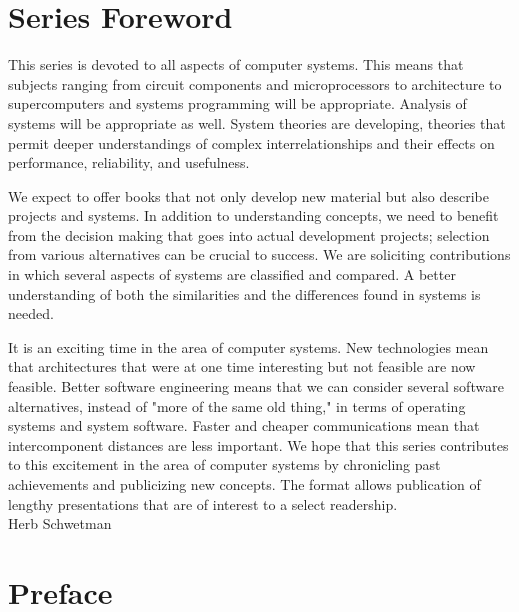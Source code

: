 \chapter*{Series Foreword}

\begingroup
\setlength{\parskip}{0pt}
\setlength{\parindent}{1.5em}

This series is devoted to all aspects of computer systems. This means that
subjects ranging from circuit components and microprocessors to architecture to
supercomputers and systems programming will be appropriate. Analysis of
systems will be appropriate as well. System theories are developing, theories
that permit deeper understandings of complex interrelationships and their
effects on performance, reliability, and usefulness.

We expect to offer books that not only develop new material but also describe
projects and systems. In addition to understanding concepts, we need to benefit
from the decision making that goes into actual development projects; selection
from various alternatives can be crucial to success. We are soliciting
contributions in which several aspects of systems are classified and compared.
A better understanding of both the similarities and the differences found in
systems is needed.

It is an exciting time in the area of computer systems. New technologies mean
that architectures that were at one time interesting but not feasible are now
feasible. Better software engineering means that we can consider several
software alternatives, instead of "more of the same old thing," in terms of
operating systems and system software. Faster and cheaper communications mean
that intercomponent distances are less important. We hope that this series
contributes to this excitement in the area of computer systems by chronicling
past achievements and publicizing new concepts. The format allows publication
of lengthy presentations that are of interest to a select readership.\\

\noindent Herb Schwetman

\endgroup

\clearpage
\thispagestyle{empty}
\null
\clearpage

\chapter*{Preface}

